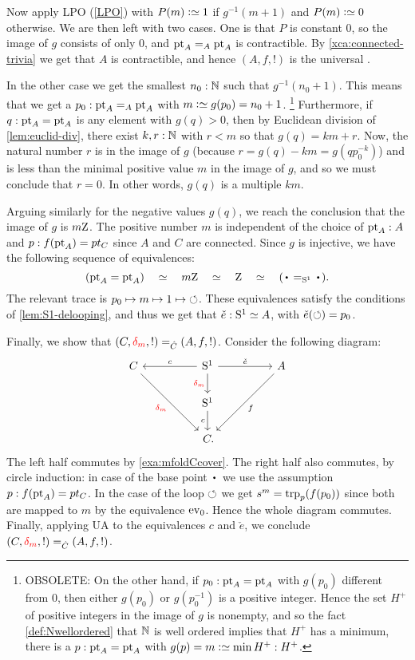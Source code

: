 Now apply LPO (\cref{LPO}) with $P(m)\defeq 1$ if $g^{-1}(m+1)$ and $P(m)\defeq 0$ otherwise.
We are then left with two cases.
One is that $P$ is constant $0$, so the image of $g$ consists of only $0$, 
and $\mathrm{pt}_A=_A\mathrm{pt}_A$ is contractible. By \cref{xca:connected-trivia}
we get that $A$ is contractible, and hence $(A,f,!)$ is the universal \covering.

In the other case we get the smallest $n_0: \mathbb{N}$ such that $g^{-1}(n_0 + 1)$.
This means that we get a $p_0:\mathrm{pt}_A=_A\mathrm{pt}_A$ with $m\defeq g(p_0)=n_0 +1$. 
\footnote{OBSOLETE: On the other hand, if $p_0:\mathrm{pt}_A=\mathrm{pt}_A$ with $g(p_0)$ different from $0$, then either $g(p_0)$ or $g(p_0^{-1})$ is a positive integer.  Hence the set $H^+$ of positive integers in the image of $g$ is nonempty, and so the fact \cref{def:Nwellordered} that $\mathbb{N}$ is well ordered implies that $H^+$ has a minimum, \ie there is a $p:\mathrm{pt}_A=\mathrm{pt}_A$ with  $g(p)=m\defequi\min H^+:H^+$.}
Furthermore, if $q:\mathrm{pt}_A=\mathrm{pt}_A$ is any element with $g(q)>0$, then  by Euclidean division of \cref{lem:euclid-div}, there exist $k,r:\mathbb{N}$ with $r<m$ so that $g(q)=km+r$.  Now, the natural number $r$ is in the image of $g$ (because $r=g(q)-km=g(qp_0^{-k})$) and is less than the minimal positive value $m$ in the image of $g$, and so we must conclude that $r=0$. In other words, $g(q)$ is a multiple $km$.

Arguing similarly for the negative values $g(q)$, we reach the conclusion that the image of $g$ is $m\mathrm{Z}$.
The positive number $m$ is independent of the choice of $\mathrm{pt}_A :A$ and $p: f(\mathrm{pt}_A)=pt_C$ since
$A$ and $C$ are connected. Since $g$ is injective, we have the following
sequence of equivalences:
\[
(\pt_A=\pt_A)\quad \equiv \quad m\zet \quad\equiv\quad \zet\quad \equiv\quad (\base=_{\Sc}\base).
\]
The relevant trace is $p_0 \mapsto m \mapsto 1 \mapsto {\circlearrowleft}$.
These equivalences satisfy the conditions of \cref{lem:S1-delooping},
and thus we get that $\check e: {\mathrm{S}^1}\simeq A$, with $\check e(\circlearrowleft) = p_0$.

Finally, we show that $(C,\dg{m},!) =_{\hat C} (A,f,!)$.
Consider the following diagram:
\[
  \begin{tikzcd}[column sep=huge]
    C\ar[ddr,"\dg{m}"'] &
    \Sc \ar[d,"\dg{m}"']\ar[l,"c"']\ar[r,"\check e"] &
    A\ar[ddl,"f"] \\
    & \Sc \ar[d,"c"'] & \\
    & \,C. &
  \end{tikzcd}
\]
The left half commutes by \cref{exa:mfoldCcover}.
The right half also commutes, by circle induction:
in case of the base point $\base$ we use the assumption $p: f(\mathrm{pt}_A)=pt_C$.
In the case of the loop $\circlearrowleft$ we get $s^m = \trp{p}(f(p_0))$ since both
are mapped to $m$ by the equivalence $\ev_0$. Hence the whole diagram
commutes. Finally, applying UA to the equivalences $c$ and $\check e$,
we conclude $(C,\dg{m},!) =_{\hat C} (A,f,!)$.

